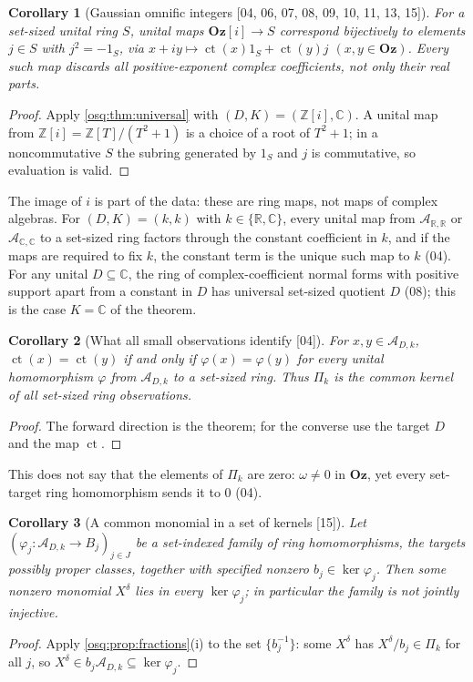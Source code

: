 \documentclass[11pt,letterpaper]{article}
\numberwithin{equation}{section}
\newtheorem{corollary}[corollary]{Corollary}
\theoremstyle{definition}
\theoremstyle{remark}
\theoremstyle{plain}
\newcommand{\Oz}{\mathbf{Oz}}
\newcommand{\GOz}{\Oz[i]}
\newcommand{\Z}{\mathbb Z}
\newcommand{\R}{\mathbb R}
\newcommand{\C}{\mathbb C}
\newcommand{\A}{\mathcal A}          %
\newcommand{\ct}{\operatorname{ct}}
\newcommand{\src}[1]{\textup{\textsf{[#1]}}}
\begin{document}
\begin{corollary}[Gaussian omnific integers \src{04, 06, 07, 08, 09, 10, 11, 13, 15}]\label{osq:cor:gaussian}
For a set-sized unital ring $S$, unital maps $\GOz\to S$ correspond bijectively to
elements $j\in S$ with $j^2=-1_S$, via
$x+iy\mapsto\ct(x)1_S+\ct(y)j$ $(x,y\in\Oz)$. Every such map discards all
positive-exponent complex coefficients, not only their real parts.
\end{corollary}
\begin{proof}
Apply \cref{osq:thm:universal} with $(D,K)=(\Z[i],\C)$. A unital map from
$\Z[i]=\Z[T]/(T^2+1)$ is a choice of a root of $T^2+1$; in a noncommutative $S$ the
subring generated by $1_S$ and $j$ is commutative, so evaluation is valid.
\end{proof}

The image of $i$ is part of the data: these are ring maps, not maps of complex algebras.
For $(D,K)=(k,k)$ with $k\in\{\R,\C\}$, every unital map from $\A_{\R,\R}$ or $\A_{\C,\C}$
to a set-sized ring factors through the constant coefficient in $k$, and if the maps are
required to fix $k$, the constant term is the unique such map to $k$ (04). For any unital
$D\subseteq\C$, the ring of complex-coefficient normal forms with positive support apart
from a constant in $D$ has universal set-sized quotient $D$ (08); this is the case
$K=\C$ of the theorem.

\begin{corollary}[What all small observations identify \src{04}]\label{osq:cor:observations}
For $x,y\in\A_{D,k}$, $\ct(x)=\ct(y)$ if and only if $\varphi(x)=\varphi(y)$ for every
unital homomorphism $\varphi$ from $\A_{D,k}$ to a set-sized ring. Thus $\Pi_k$ is the
common kernel of all set-sized ring observations.
\end{corollary}
\begin{proof}
The forward direction is the theorem; for the converse use the target $D$ and the map
$\ct$.
\end{proof}

This does not say that the elements of $\Pi_k$ are zero: $\omega\ne0$ in $\Oz$, yet every
set-target ring homomorphism sends it to $0$ (04).

\begin{corollary}[A common monomial in a set of kernels \src{15}]\label{osq:rep:cor:kernels}
Let $(\varphi_j:\A_{D,k}\to B_j)_{j\in J}$ be a set-indexed family of ring homomorphisms, the targets possibly proper
classes, together with specified nonzero $b_j\in\ker\varphi_j$. Then some nonzero monomial $X^\delta$ lies in every
$\ker\varphi_j$; in particular the family is not jointly injective.
\end{corollary}
\begin{proof}
Apply \cref{osq:prop:fractions}(i) to the set $\{b_j^{-1}\}$: some $X^\delta$ has $X^\delta/b_j\in\Pi_k$ for all $j$, so
$X^\delta\in b_j\A_{D,k}\subseteq\ker\varphi_j$.
\end{proof}
\end{document}
